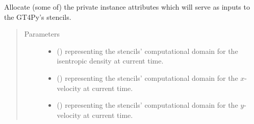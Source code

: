 \documentclass[letterpaper,10pt,english]{sphinxmanual}
\begin{document}
\begin{fulllineitems}
\begin{fulllineitems}
\begin{quote}
\begin{description}
\begin{itemize}
\end{itemize}

\end{description}\end{quote}

\end{fulllineitems}


\begin{fulllineitems}
\label{\detokenize{api:dycore.prognostic_isentropic.PrognosticIsentropic._allocate_inputs}}
Allocate (some of) the private instance attributes which will serve as inputs to the GT4Py’s stencils.
\begin{quote}\begin{description}
\item[{Parameters}] \leavevmode\begin{itemize}
\item {} 
 () \textendash{}  representing the stencils’ computational domain for the isentropic density at current time.

\item {} 
 () \textendash{}  representing the stencils’ computational domain for the \(x\)-velocity at current time.

\item {} 
 () \textendash{}  representing the stencils’ computational domain for the \(y\)-velocity at current time.

\end{itemize}

\end{description}\end{quote}

\end{fulllineitems}


\end{fulllineitems}
\end{document}
